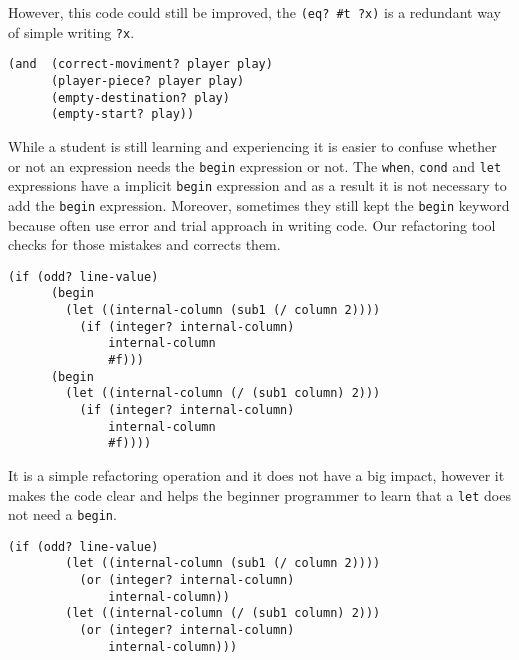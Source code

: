 However, this code could still be improved, the {\tt (eq? \#t ?x)} is a redundant way
of simple writing {\tt ?x}.
\begin{lstlisting}[basicstyle=\ttfamily]
(and  (correct-moviment? player play)
      (player-piece? player play)
      (empty-destination? play)
      (empty-start? play))
\end{lstlisting}


While a student is still learning and experiencing it is easier to confuse whether
or not an expression needs the {\tt begin} expression or not.
The {\tt when}, {\tt cond} and {\tt let} expressions have a implicit {\tt begin} expression and
as a result it is not necessary to add the {\tt begin} expression.
Moreover, sometimes they still kept the {\tt begin} keyword because often use error and trial approach
in writing code.
Our refactoring tool checks for those mistakes and corrects them.
\begin{lstlisting}[basicstyle=\ttfamily]
  (if (odd? line-value)
      (begin
        (let ((internal-column (sub1 (/ column 2))))
          (if (integer? internal-column)
              internal-column
              #f)))
      (begin
        (let ((internal-column (/ (sub1 column) 2)))
          (if (integer? internal-column)
              internal-column
              #f))))
\end{lstlisting}
It is a simple refactoring operation and it does not have a big impact, however
it makes the code clear and helps the beginner programmer to learn that a {\tt let}
does not need a {\tt begin}.
\begin{lstlisting}[basicstyle=\ttfamily]
  (if (odd? line-value)
        (let ((internal-column (sub1 (/ column 2))))
          (or (integer? internal-column)
              internal-column))
        (let ((internal-column (/ (sub1 column) 2)))
          (or (integer? internal-column)
              internal-column)))
\end{lstlisting}


